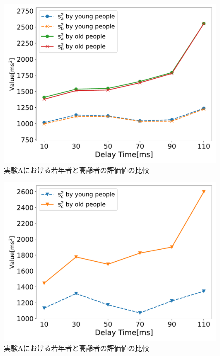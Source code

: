 
\begin{figure}[tbp]
  \centering
  \includegraphics[scale=0.5]{figures/Honbann/Comparison_young_old/110_var_SaSb.pdf}
  \caption{実験Aにおける若年者と高齢者の評価値の比較}
  \label{fig:Var_110ms_Sa_Sb}
\end{figure}
\begin{figure}[tbp]
  \centering
  \includegraphics[scale=0.5]{figures/Honbann/Comparison_young_old/110_var_Sc.pdf}
  \caption{実験Aにおける若年者と高齢者の評価値の比較}
  \label{fig:Var_110ms_Sc}
\end{figure}


